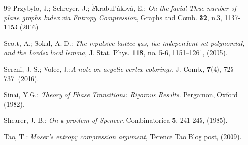 \documentclass[11pt]{article}
\begin{document}
\begin{thebibliography}{99}
 Przybylo, J.; Schreyer, J.; $\check{S}$krabul'\'akov\'a, E.: {\it On the facial Thue number
of plane graphs Index via Entropy Compression}, Graphs and Comb. {\bf 32}, n.3, 1137-1153 (2016).


  Scott, A.; Sokal, A. D.: {\it The repulsive lattice gas,
the independent-set polynomial, and the Lov\'asz local lemma},
 J. Stat. Phys.  {\bf 118}, no. 5-6, 1151--1261, (2005).

   Sereni, J. S.; Volec, J.:{\it  A note on acyclic vertex-colorings}. J. Comb., {\bf 7}(4), 725-737, (2016).

   Sinai, Y.G.: {\it Theory of Phase Transitions: Rigorous Results}. Pergamon, Oxford (1982).

 Shearer, J. B.: {\it On a problem of Spencer}. Combinatorica {\bf 5}, 241-245, (1985).

 Tao, T.: {\it Moser's entropy compression argument},  Terence Tao Blog post, (2009).





\end{thebibliography}
\end{document}

